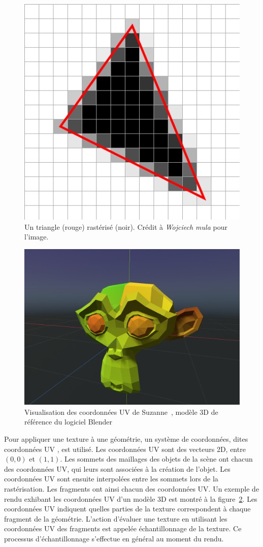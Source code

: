 \begin{figure}[h]
    \centering
    \includegraphics[width=.55\textwidth]{contenu/resources/images/rasterization}
    \caption[Rastérisation d'un triangle]{Un triangle (rouge) rastérisé (noir). Crédit à \textit{Wojciech mula} pour l'image.}
    \label{fig:rasterization}
\end{figure}

\bigskip

\begin{figure}
    \centering
    \includegraphics[width=.55\textwidth]{contenu/resources/images/uv_suzanne}
    \caption[Coordonnées UV du modèle Suzanne]{Visualisation des coordonnées UV de Suzanne~\cite{overbruggen_suzanne_2002}, modèle 3D de référence du logiciel Blender}
    \label{fig:uv-suzanne}
\end{figure}

Pour appliquer une texture à une géométrie, un système de coordonnées, dites \og coordonnées UV \fg, est utilisé. Les coordonnées UV sont des vecteurs 2D, entre $(0, 0)$ et $(1, 1)$. Les sommets des maillages des objets de la scène ont chacun des coordonnées UV, qui leurs sont associées à la création de l'objet. Les coordonnées UV sont ensuite interpolées entre les sommets lors de la rastérisation. Les fragments ont ainsi chacun des coordonnées UV. Un exemple de rendu exhibant les coordonnées UV d'un modèle 3D est montré à la figure~\ref{fig:uv-suzanne}. Les coordonnées UV indiquent quelles parties de la texture correspondent à chaque fragment de la géométrie. L'action d'évaluer une texture en utilisant les coordonnées UV des fragments est appelée \og échantillonnage \fg de la texture. Ce processus d'échantillonnage s'effectue en général au moment du rendu.

